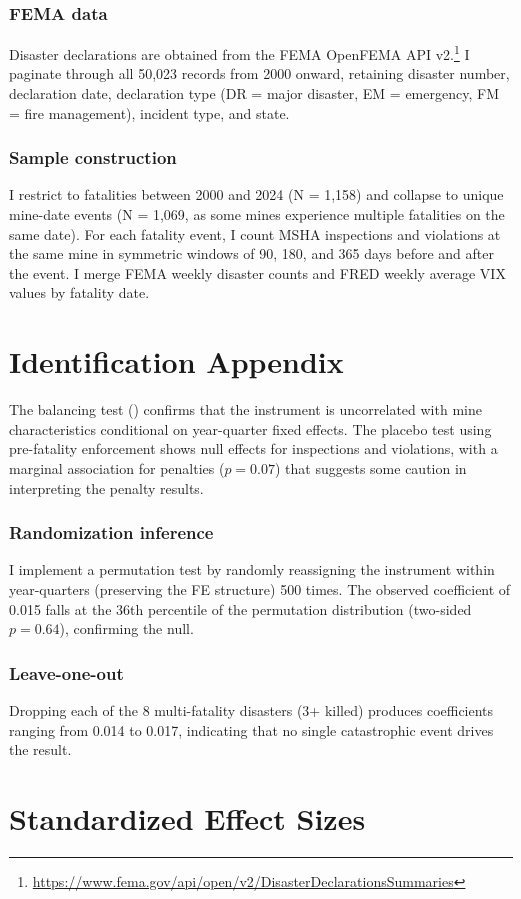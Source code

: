 \documentclass[12pt]{article}
\begin{document}
\subsubsection*{FEMA data} Disaster declarations are obtained from the FEMA OpenFEMA API v2.\footnote{\url{https://www.fema.gov/api/open/v2/DisasterDeclarationsSummaries}} I paginate through all 50,023 records from 2000 onward, retaining disaster number, declaration date, declaration type (DR = major disaster, EM = emergency, FM = fire management), incident type, and state.

\subsubsection*{Sample construction} I restrict to fatalities between 2000 and 2024 (N = 1,158) and collapse to unique mine-date events (N = 1,069, as some mines experience multiple fatalities on the same date). For each fatality event, I count MSHA inspections and violations at the same mine in symmetric windows of 90, 180, and 365 days before and after the event. I merge FEMA weekly disaster counts and FRED weekly average VIX values by fatality date.

\section{Identification Appendix}

The balancing test () confirms that the instrument is uncorrelated with mine characteristics conditional on year-quarter fixed effects. The placebo test using pre-fatality enforcement shows null effects for inspections and violations, with a marginal association for penalties ($p = 0.07$) that suggests some caution in interpreting the penalty results.

\subsubsection*{Randomization inference} I implement a permutation test by randomly reassigning the instrument within year-quarters (preserving the FE structure) 500 times. The observed coefficient of 0.015 falls at the 36th percentile of the permutation distribution (two-sided $p = 0.64$), confirming the null.

\subsubsection*{Leave-one-out} Dropping each of the 8 multi-fatality disasters (3+ killed) produces coefficients ranging from 0.014 to 0.017, indicating that no single catastrophic event drives the result.

\section{Standardized Effect Sizes}
\label{sec:sde}


\end{document}
